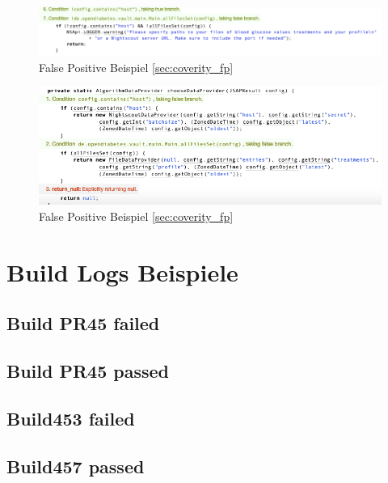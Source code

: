\documentclass[accentcolor=tud0b,12pt,paper=a4]{tudreport}
\begin{document}
\begin{figure}[h]
\includegraphics[width=1.0\textwidth]{Coverity_FP1}
\caption{False Positive Beispiel \ref{sec:coverity_fp}}
\centering
\label{fig:coverity_fp1}
\end{figure}

\begin{figure}[h]
\includegraphics[width=1.0\textwidth]{Coverity_FP2}
\caption{False Positive Beispiel \ref{sec:coverity_fp}}
\centering
\label{fig:coverity_fp2}
\end{figure}

\section{Build Logs Beispiele}

\subsection{Build PR45 failed}



\subsection{Build PR45 passed}



\subsection{Build453 failed}



\subsection{Build457 passed}


\end{document}
